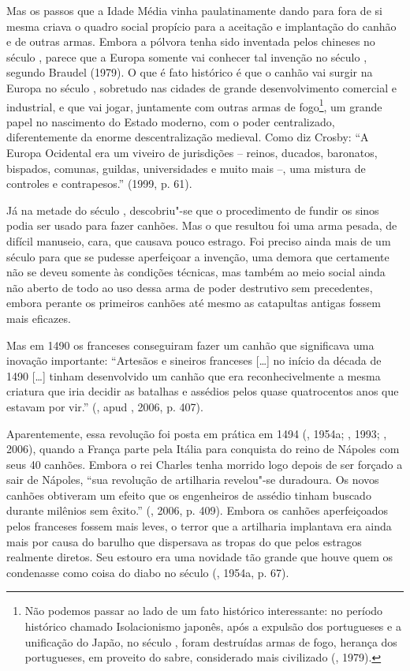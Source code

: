 Mas os passos que a Idade Média vinha paulatinamente dando para fora de
si mesma criava o quadro social propício para a aceitação e implantação
do canhão e de outras armas. Embora a pólvora tenha sido inventada pelos
chineses no século , parece que a Europa somente vai conhecer tal
invenção no século , segundo Braudel (1979). O que é fato histórico
é que o canhão vai surgir na Europa no século , sobretudo nas cidades
de grande desenvolvimento comercial e industrial, e que vai jogar,
juntamente com outras armas de fogo\footnote{Não podemos passar ao lado
  de um fato histórico interessante: no período
  histórico chamado Isolacionismo japonês, após a expulsão dos
  portugueses e a unificação do Japão, no século , foram destruídas
  armas de fogo, herança dos portugueses, em proveito do sabre,
  considerado mais civilizado (, 1979).}, um grande papel no
nascimento do Estado moderno, com o poder centralizado, diferentemente
da enorme descentralização medieval. Como diz Crosby: ``A Europa
Ocidental era um viveiro de jurisdições -- reinos, ducados, baronatos,
bispados, comunas, guildas, universidades e muito mais --, uma mistura
de controles e contrapesos.'' (1999, p. 61).

Já na metade do século , descobriu"-se que o procedimento de fundir os
sinos podia ser usado para fazer canhões. Mas o que resultou foi uma
arma pesada, de difícil manuseio, cara, que causava pouco estrago. Foi
preciso ainda mais de um século para que se pudesse aperfeiçoar a
invenção, uma demora que certamente não se deveu somente às condições
técnicas, mas também ao meio social ainda não aberto de todo ao uso
dessa arma de poder destrutivo sem precedentes, embora perante os
primeiros canhões até mesmo as catapultas antigas fossem mais eficazes.

Mas em 1490 os franceses conseguiram fazer um canhão que significava uma
inovação importante: ``Artesãos e sineiros franceses [\ldots{}] no
início da década de 1490 [\ldots{}] tinham desenvolvido um canhão
que era reconhecivelmente a mesma criatura que iria decidir as batalhas
e assédios pelos quase quatrocentos anos que estavam por vir.'' (,
apud , 2006, p. 407).

Aparentemente, essa revolução foi posta em prática em 1494 (, 1954a;
, 1993; , 2006), quando a França parte pela Itália para
conquista do reino de Nápoles com seus 40 canhões. Embora o rei Charles
 tenha morrido logo depois de ser forçado a sair de Nápoles, ``sua
revolução de artilharia revelou"-se duradoura. Os novos canhões obtiveram
um efeito que os engenheiros de assédio tinham buscado durante milênios
sem êxito.'' (, 2006, p. 409). Embora os canhões aperfeiçoados
pelos franceses fossem mais leves, o terror que a artilharia implantava
era ainda mais por causa do barulho que dispersava as tropas do que
pelos estragos realmente diretos. Seu estouro era uma novidade tão
grande que houve quem os condenasse como coisa do diabo no século 
(, 1954a, p. 67).

